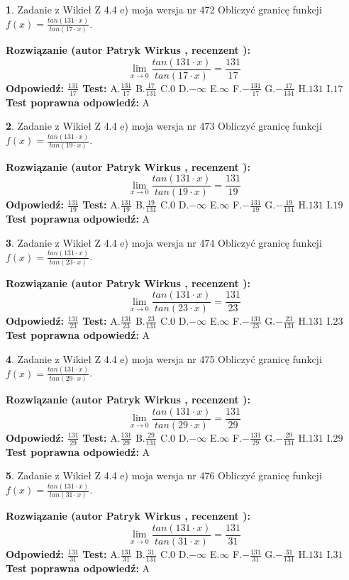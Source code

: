 \documentclass[12pt, a4paper]{article}
\theoremstyle{definition} %
\newtheorem{zad}{}
\newcommand{\zadStart}[1]{\begin{zad}#1\newline}
\newcommand{\zadStop}{\end{zad}}
\newcommand{\rozwStart}[2]{\noindent \textbf{Rozwiązanie (autor #1 , recenzent #2): }\newline}
\newcommand{\rozwStop}{\newline}
\newcommand{\odpStart}{\noindent \textbf{Odpowiedź:}\newline}
\newcommand{\odpStop}{\newline}
\newcommand{\testStart}{\noindent \textbf{Test:}\newline}
\newcommand{\testStop}{\newline}
\newcommand{\kluczStart}{\noindent \textbf{Test poprawna odpowiedź:}\newline}
\newcommand{\kluczStop}{\newline}
\begin{document}
\zadStart{Zadanie z Wikieł Z 4.4 e) moja wersja nr 472}
Obliczyć granicę funkcji $f(x)=\frac{tan(131\cdot x)}{tan(17\cdot x)}$.
\zadStop
\rozwStart{Patryk Wirkus}{}
$$\lim\limits_{x\to 0}\frac{tan(131\cdot x)}{tan(17\cdot x)}=
\frac{131}{17}$$
\rozwStop
\odpStart
$\frac{131}{17}$
\odpStop
\testStart
A.$\frac{131}{17}$
B.$\frac{17}{131}$
C.$0$
D.$-\infty$
E.$\infty$
F.$-\frac{131}{17}$
G.$-\frac{17}{131}$
H.$131$
I.$17$
\testStop
\kluczStart
A
\kluczStop



\zadStart{Zadanie z Wikieł Z 4.4 e) moja wersja nr 473}
Obliczyć granicę funkcji $f(x)=\frac{tan(131\cdot x)}{tan(19\cdot x)}$.
\zadStop
\rozwStart{Patryk Wirkus}{}
$$\lim\limits_{x\to 0}\frac{tan(131\cdot x)}{tan(19\cdot x)}=
\frac{131}{19}$$
\rozwStop
\odpStart
$\frac{131}{19}$
\odpStop
\testStart
A.$\frac{131}{19}$
B.$\frac{19}{131}$
C.$0$
D.$-\infty$
E.$\infty$
F.$-\frac{131}{19}$
G.$-\frac{19}{131}$
H.$131$
I.$19$
\testStop
\kluczStart
A
\kluczStop



\zadStart{Zadanie z Wikieł Z 4.4 e) moja wersja nr 474}
Obliczyć granicę funkcji $f(x)=\frac{tan(131\cdot x)}{tan(23\cdot x)}$.
\zadStop
\rozwStart{Patryk Wirkus}{}
$$\lim\limits_{x\to 0}\frac{tan(131\cdot x)}{tan(23\cdot x)}=
\frac{131}{23}$$
\rozwStop
\odpStart
$\frac{131}{23}$
\odpStop
\testStart
A.$\frac{131}{23}$
B.$\frac{23}{131}$
C.$0$
D.$-\infty$
E.$\infty$
F.$-\frac{131}{23}$
G.$-\frac{23}{131}$
H.$131$
I.$23$
\testStop
\kluczStart
A
\kluczStop



\zadStart{Zadanie z Wikieł Z 4.4 e) moja wersja nr 475}
Obliczyć granicę funkcji $f(x)=\frac{tan(131\cdot x)}{tan(29\cdot x)}$.
\zadStop
\rozwStart{Patryk Wirkus}{}
$$\lim\limits_{x\to 0}\frac{tan(131\cdot x)}{tan(29\cdot x)}=
\frac{131}{29}$$
\rozwStop
\odpStart
$\frac{131}{29}$
\odpStop
\testStart
A.$\frac{131}{29}$
B.$\frac{29}{131}$
C.$0$
D.$-\infty$
E.$\infty$
F.$-\frac{131}{29}$
G.$-\frac{29}{131}$
H.$131$
I.$29$
\testStop
\kluczStart
A
\kluczStop



\zadStart{Zadanie z Wikieł Z 4.4 e) moja wersja nr 476}
Obliczyć granicę funkcji $f(x)=\frac{tan(131\cdot x)}{tan(31\cdot x)}$.
\zadStop
\rozwStart{Patryk Wirkus}{}
$$\lim\limits_{x\to 0}\frac{tan(131\cdot x)}{tan(31\cdot x)}=
\frac{131}{31}$$
\rozwStop
\odpStart
$\frac{131}{31}$
\odpStop
\testStart
A.$\frac{131}{31}$
B.$\frac{31}{131}$
C.$0$
D.$-\infty$
E.$\infty$
F.$-\frac{131}{31}$
G.$-\frac{31}{131}$
H.$131$
I.$31$
\testStop
\kluczStart
A
\kluczStop
\end{document}
